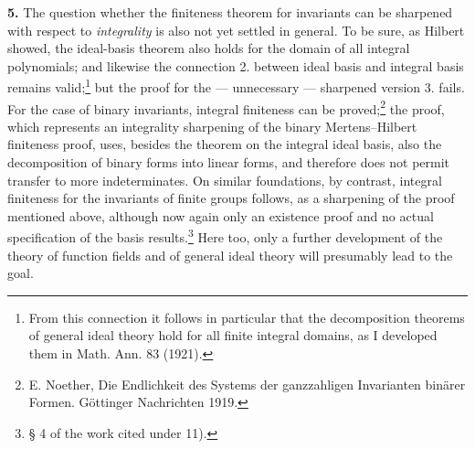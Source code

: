 \documentclass[11pt]{article}
\begin{document}
\textbf{5.} The question whether the finiteness theorem for invariants can be sharpened with respect to \emph{integrality} is also not yet settled in general. To be sure, as Hilbert showed, the ideal-basis theorem also holds for the domain of all integral polynomials; and likewise the connection 2. between ideal basis and integral basis remains valid;\footnote{From this connection it follows in particular that the decomposition theorems of general ideal theory hold for all finite integral domains, as I developed them in Math. Ann. 83 (1921).} but the proof for the --- unnecessary --- sharpened version 3. fails. For the case of binary invariants, integral finiteness can be proved;\footnote{E. Noether, Die Endlichkeit des Systems der ganzzahligen Invarianten binärer Formen. Göttinger Nachrichten 1919.} the proof, which represents an integrality sharpening of the binary Mertens--Hilbert finiteness proof, uses, besides the theorem on the integral ideal basis, also the decomposition of binary forms into linear forms, and therefore does not permit transfer to more indeterminates. On similar foundations, by contrast, integral finiteness for the invariants of finite groups follows, as a sharpening of the proof mentioned above, although now again only an existence proof and no actual specification of the basis results.\footnote{§ 4 of the work cited under 11).} Here too, only a further development of the theory of function fields and of general ideal theory will presumably lead to the goal.
\end{document}
